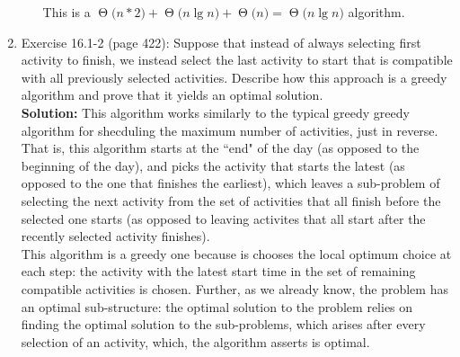 \documentclass[11pts]{article}
\newcommand{\BigTheta}[1]{\ensuremath{\operatorname{\Theta}\bigl(#1\bigr)}}
\begin{document}
\begin{enumerate}
\begin{enumerate}
  This is a
  $\BigTheta{n * 2} + \BigTheta{n\lg{n}} + \BigTheta{n} = \BigTheta{n\lg{n}}$
  algorithm.
  \end{enumerate}

\newpage
\item Exercise 16.1-2 (page 422): Suppose that instead of always selecting
first activity to finish, we instead select the last activity to start that
is compatible with all previously selected activities. Describe how this
approach is a greedy algorithm and prove that it yields an optimal solution. \\

  \textbf{Solution:} This algorithm works similarly to the typical greedy
  greedy algorithm for shecduling the maximum number of activities, just in
  reverse. That is, this algorithm starts at the ``end" of the day (as
  opposed to the beginning of the day), and picks
  the activity that starts the latest (as opposed to the one that finishes
  the earliest), which leaves a sub-problem of selecting the next activity
  from the set of activities that all finish before the selected one starts
  (as opposed to leaving activites that all start after the recently selected
  activity finishes). \\

  This algorithm is a greedy one because is chooses the local optimum choice
  at each step: the activity with the latest start time in the set of
  remaining compatible activities is chosen. Further, as we already know,
  the problem has an optimal sub-structure: the optimal solution to the
  problem relies on finding the optimal solution to the sub-problems, which
  arises after every selection of an activity, which, the algorithm asserts
  is optimal. \\


\end{enumerate}
\end{document}
